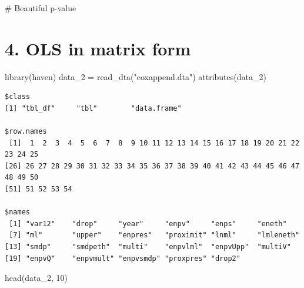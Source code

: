 \documentclass[
  letterpaper,
  DIV=11,
  numbers=noendperiod]{scrartcl}
\newenvironment{Shaded}{\begin{snugshade}}{\end{snugshade}}
\newcommand{\CommentTok}[1]{\textcolor[rgb]{0.37,0.37,0.37}{#1}}
\newcommand{\DecValTok}[1]{\textcolor[rgb]{0.68,0.00,0.00}{#1}}
\newcommand{\FunctionTok}[1]{\textcolor[rgb]{0.28,0.35,0.67}{#1}}
\newcommand{\NormalTok}[1]{\textcolor[rgb]{0.00,0.23,0.31}{#1}}
\newcommand{\OtherTok}[1]{\textcolor[rgb]{0.00,0.23,0.31}{#1}}
\newcommand{\StringTok}[1]{\textcolor[rgb]{0.13,0.47,0.30}{#1}}
\begin{document}
\begin{Shaded}
\begin{Highlighting}[]
\CommentTok{\# Beautiful p{-}value}
\end{Highlighting}
\end{Shaded}

\section{4. OLS in matrix form}\label{ols-in-matrix-form}

\begin{Shaded}
\begin{Highlighting}[]
\FunctionTok{library}\NormalTok{(haven)}
\NormalTok{data\_2 }\OtherTok{=} \FunctionTok{read\_dta}\NormalTok{(}\StringTok{"coxappend.dta"}\NormalTok{)}
\FunctionTok{attributes}\NormalTok{(data\_2)}
\end{Highlighting}
\end{Shaded}

\begin{verbatim}
$class
[1] "tbl_df"     "tbl"        "data.frame"

$row.names
 [1]  1  2  3  4  5  6  7  8  9 10 11 12 13 14 15 16 17 18 19 20 21 22 23 24 25
[26] 26 27 28 29 30 31 32 33 34 35 36 37 38 39 40 41 42 43 44 45 46 47 48 49 50
[51] 51 52 53 54

$names
 [1] "var12"    "drop"     "year"     "enpv"     "enps"     "eneth"   
 [7] "ml"       "upper"    "enpres"   "proximit" "lnml"     "lmleneth"
[13] "smdp"     "smdpeth"  "multi"    "enpvlml"  "enpvUpp"  "multiV"  
[19] "enpvQ"    "enpvmult" "enpvsmdp" "proxpres" "drop2"   
\end{verbatim}

\begin{Shaded}
\begin{Highlighting}[]
\FunctionTok{head}\NormalTok{(data\_2, }\DecValTok{10}\NormalTok{)}
\end{Highlighting}
\end{Shaded}
\end{document}

